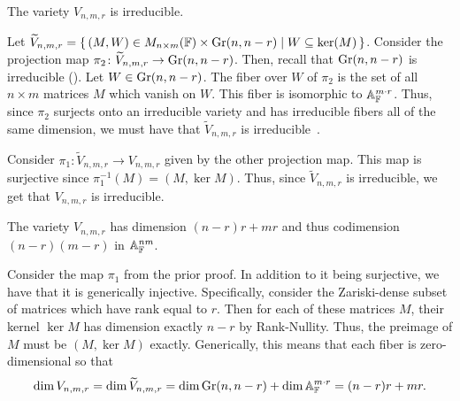 \documentclass[letterpaper, 11pt]{amsart}
\begin{document}
\begin{prop}\label{prop:det_variety_irred}
  The variety $V_{n, m, r}$ is irreducible.
\end{prop}
\begin{pf}
  Let $\widetilde{V}_{n, m, r} = \set{(M, W) \in M_{n \times m}(\mathbb{F}) \times \operatorname{Gr}(n, n - r) | W \subseteq \ker(M)}$.
  Consider the projection map $\pi_2\colon \widetilde{V}_{n, m, r} \to \operatorname{Gr}(n, n - r)$.
  Then, recall that $\operatorname{Gr}(n, n - r)$ is irreducible ().
  Let $W \in \operatorname{Gr}(n, n - r)$.
  The fiber over $W$ of $\pi_2$ is the set of all $n \times m$ matrices $M$ which vanish on $W$.
  This fiber is isomorphic to $\mathbb{A}_{\mathbb{F}}^{m \cdot r}$.
  Thus, since $\pi_2$ surjects onto an irreducible variety and has irreducible fibers all of the same dimension, we must have that $\widetilde{V}_{n, m ,r}$ is irreducible~\cite[Theorem 11.14]{Har92}.

  Consider $\pi_1\colon \widetilde{V}_{n, m, r} \to V_{n, m, r}$ given by the other projection map.
  This map is surjective since $\pi_1^{-1}(M) = (M, \ker M)$.
  Thus, since $\widetilde{V}_{n, m, r}$ is irreducible, we get that $V_{n, m, r}$ is irreducible.
\end{pf}

\begin{prop}\label{prop:dim_det_variety}
  The variety $V_{n, m, r}$ has dimension $(n - r)r + mr$ and thus codimension $(n - r)(m - r)$ in $\mathbb{A}_{\mathbb{F}}^{nm}$.
\end{prop}
\begin{pf}
  Consider the map $\pi_1$ from the prior proof.
  In addition to it being surjective, we have that it is generically injective.
  Specifically, consider the Zariski-dense subset of matrices which have rank equal to $r$.
  Then for each of these matrices $M$, their kernel $\ker M$ has dimension exactly $n - r$ by Rank-Nullity.
  Thus, the preimage of $M$ must be $(M, \ker M)$ exactly.
  Generically, this means that each fiber is zero-dimensional so that
  \[
    \dim V_{n, m ,r} = \dim \widetilde{V}_{n, m, r} = \dim \operatorname{Gr}(n, n - r) + \dim \mathbb{A}_{\mathbb{F}}^{m \cdot r} = (n - r)r + mr.
  \]
\end{pf}
\end{document}
